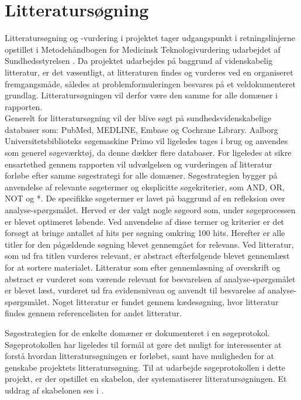 \section{Litteratursøgning} \label{litteratursogning}
Litteratursøgning og -vurdering i projektet tager udgangspunkt i retningslinjerne opstillet i Metodehåndbogen for Medicinsk Teknologivurdering udarbejdet af Sundhedsstyrelsen \citep{metodehaandbogen}. Da projektet udarbejdes på baggrund af videnskabelig litteratur, er det væsentligt, at litteraturen findes og vurderes ved en organiseret fremgangsmåde, således at problemformuleringen besvares på et veldokumenteret grundlag. Litteratursøgningen vil derfor være den samme for alle domæner i rapporten. \\
Generelt for litteratursøgning vil der blive søgt på sundhedsvidenskabelige databaser som: PubMed, MEDLINE, Embase og Cochrane Library. Aalborg Universitetsbiblioteks søgemaskine Primo vil ligeledes tages i brug og anvendes som generel søgeværktøj, da denne dækker flere databaser. For ligeledes at sikre ensartethed gennem rapporten vil udvælgelsen og vurderingen af litteratur forløbe efter samme søgestrategi for alle domæner. Søgestrategien bygger på anvendelse af relevante søgetermer og eksplicitte søgekriterier, som AND, OR, NOT og *. De specifikke søgetermer er lavet på baggrund af en refleksion over analyse-spørgsmålet. Herved er der valgt nogle søgeord som, under søgeprocessen er blevet optimeret løbende. Ved anvendelse af disse termer og kriterier er det forsøgt at bringe antallet af hits per søgning omkring 100 hits. Herefter er alle titler for den pågældende søgning blevet gennemgået for relevans. Ved litteratur, som ud fra titlen vurderes relevant, er abstract efterfølgende blevet gennemlæst for at sortere materialet. Litteratur som efter gennemlæsning af overskrift og abstract er vurderet som værende relevant for besvarelsen af analyse-spørgsmålet er blevet læst, vurderet ud fra evidensniveau og anvendt til besvarelse af analyse-spørgsmålet. Noget litteratur er fundet gennem kædesøgning, hvor litteratur findes gennem referencelisten for andet litteratur.

Søgestrategien for de enkelte domæner er dokumenteret i en søgeprotokol. Søgeprotokollen har ligeledes til formål at gøre det muligt for interessenter at forstå hvordan litteratursøgningen er forløbet, samt have muligheden for at genskabe projektets litteratursøgning. \citep{metodehaandbogen} Til at udarbejde søgeprotokollen i dette projekt, er der opstillet en skabelon, der systematiserer litteratursøgningen. Et uddrag af skabelonen ses i .

